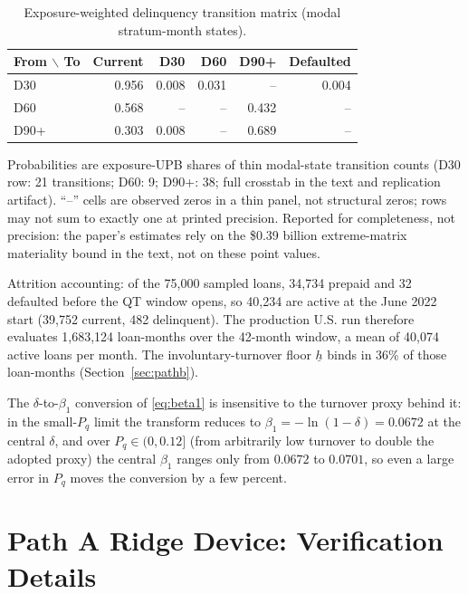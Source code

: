 \documentclass[12pt]{article}
\begin{document}
\begin{table}[H]
\centering
\small
\begin{threeparttable}
\caption{Exposure-weighted delinquency transition matrix (modal stratum-month states).}
\label{tab:delinq}
\begin{tabular}{@{}lrrrrr@{}}
\toprule
From $\backslash$ To & Current & D30 & D60 & D90+ & Defaulted \\
\midrule
D30 & 0.956 & 0.008 & 0.031 & -- & 0.004 \\
D60 & 0.568 & -- & -- & 0.432 & -- \\
D90+ & 0.303 & 0.008 & -- & 0.689 & -- \\
\bottomrule
\end{tabular}
\begin{tablenotes}[flushleft]\footnotesize
\item Probabilities are exposure-UPB shares of thin modal-state transition counts (D30 row: 21 transitions; D60: 9; D90+: 38; full crosstab in the text and replication artifact). ``--'' cells are observed zeros in a thin panel, not structural zeros; rows may not sum to exactly one at printed precision. Reported for completeness, not precision: the paper's estimates rely on the \$0.39 billion extreme-matrix materiality bound in the text, not on these point values.
\end{tablenotes}
\end{threeparttable}
\end{table}
Attrition accounting: of the 75,000 sampled loans, 34,734 prepaid and 32 defaulted before the QT window opens, so 40,234 are active at the June 2022 start (39,752 current, 482 delinquent). The production U.S. run therefore evaluates 1,683,124 loan-months over the 42-month window, a mean of 40,074 active loans per month. The involuntary-turnover floor $\underline{h}$ binds in 36\% of those loan-months (Section~\ref{sec:pathb}).

The $\delta$-to-$\beta_1$ conversion of \eqref{eq:beta1} is insensitive to the turnover proxy behind it: in the small-$P_q$ limit the transform reduces to $\beta_1 = -\ln(1-\delta) = 0.0672$ at the central $\delta$, and over $P_q \in (0, 0.12]$ (from arbitrarily low turnover to double the adopted proxy) the central $\beta_1$ ranges only from $0.0672$ to $0.0701$, so even a large error in $P_q$ moves the conversion by a few percent.

\section{Path A Ridge Device: Verification Details}\label{app:ridge}
\end{document}
